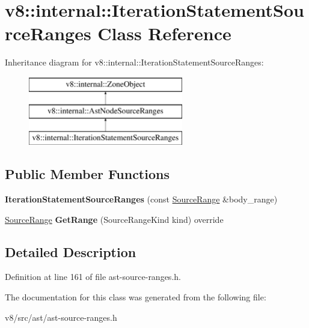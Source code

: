 \hypertarget{classv8_1_1internal_1_1IterationStatementSourceRanges}{}\section{v8\+:\+:internal\+:\+:Iteration\+Statement\+Source\+Ranges Class Reference}
\label{classv8_1_1internal_1_1IterationStatementSourceRanges}
Inheritance diagram for v8\+:\+:internal\+:\+:Iteration\+Statement\+Source\+Ranges\+:\begin{figure}[H]
\begin{center}
\leavevmode
\includegraphics[height=3.000000cm]{classv8_1_1internal_1_1IterationStatementSourceRanges}
\end{center}
\end{figure}
\subsection*{Public Member Functions}
\begin{DoxyCompactItemize}
\item 
\mbox{\label{classv8_1_1internal_1_1IterationStatementSourceRanges_ac68c8603f16e04035c8f6141b1a191a7}} 
{\bfseries Iteration\+Statement\+Source\+Ranges} (const \mbox{\hyperlink{structv8_1_1internal_1_1SourceRange}{Source\+Range}} \&body\+\_\+range)
\item 
\mbox{\label{classv8_1_1internal_1_1IterationStatementSourceRanges_ac0fa574e509acd47984aafe189abb317}} 
\mbox{\hyperlink{structv8_1_1internal_1_1SourceRange}{Source\+Range}} {\bfseries Get\+Range} (Source\+Range\+Kind kind) override
\end{DoxyCompactItemize}


\subsection{Detailed Description}


Definition at line 161 of file ast-\/source-\/ranges.\+h.



The documentation for this class was generated from the following file\+:\begin{DoxyCompactItemize}
\item 
v8/src/ast/ast-\/source-\/ranges.\+h\end{DoxyCompactItemize}

